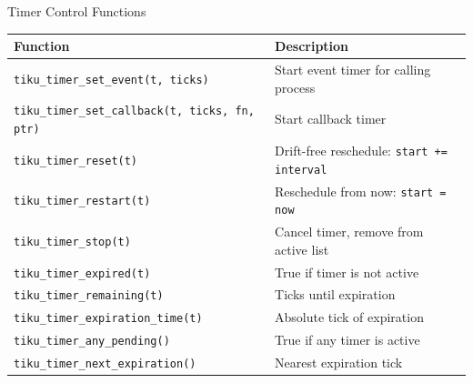 \documentclass[aspectratio=169, 10pt]{beamer}
\begin{document}
\begin{frame}[fragile]{Timer Control Functions}
\begin{table}
\centering
\small
\begin{tabular}{@{}lp{8cm}@{}}
\toprule
\textbf{Function} & \textbf{Description} \\
\midrule
\texttt{tiku\_timer\_set\_event(t, ticks)}     & Start event timer for calling process \\
\texttt{tiku\_timer\_set\_callback(t, ticks, fn, ptr)} & Start callback timer \\
\texttt{tiku\_timer\_reset(t)}                 & Drift-free reschedule: \texttt{start += interval} \\
\texttt{tiku\_timer\_restart(t)}               & Reschedule from now: \texttt{start = now} \\
\texttt{tiku\_timer\_stop(t)}                  & Cancel timer, remove from active list \\
\midrule
\texttt{tiku\_timer\_expired(t)}               & True if timer is not active \\
\texttt{tiku\_timer\_remaining(t)}             & Ticks until expiration \\
\texttt{tiku\_timer\_expiration\_time(t)}       & Absolute tick of expiration \\
\midrule
\texttt{tiku\_timer\_any\_pending()}            & True if any timer is active \\
\texttt{tiku\_timer\_next\_expiration()}        & Nearest expiration tick \\
\bottomrule
\end{tabular}
\end{table}
\end{frame}
\end{document}
